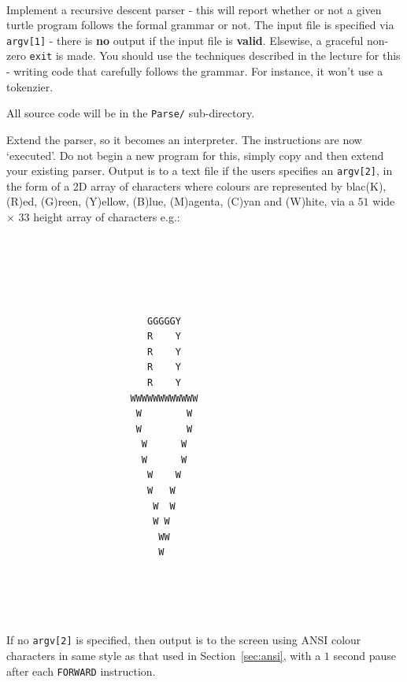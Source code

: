 \begin{exercise}

\strut\\[1em]
\vspace*{1ex}

\noindent Implement a recursive descent parser - this will report
whether or not a given turtle program follows the formal grammar or not.
The input file is specified via \verb^argv[1]^ - there is {\bf no}
output if the input file is {\bf valid}. Elsewise, a graceful non-zero
\verb^exit^ is made.  You should use the techniques described in the
lecture for this - writing code that carefully follows the grammar. For
instance, it won't use a tokenzier.

\noindent All source code will be in the \verb^Parse/^ sub-directory.

\vspace*{1em}

\noindent Extend the parser, so it becomes an interpreter. The
instructions are now `executed'. Do not begin a new program for this,
simply copy and then extend your existing parser. Output is to a text
file if the users specifies an \verb^argv[2]^, in the form of a 2D array
of characters where colours are represented by blac(K), (R)ed, (G)reen,
(Y)ellow, (B)lue, (M)agenta, (C)yan and (W)hite, via a $51$ wide $\times$
$33$ height array of characters e.g.:

\begin{verbatim}





                         GGGGGY
                         R    Y
                         R    Y
                         R    Y
                         R    Y
                      WWWWWWWWWWWW
                       W        W
                       W        W
                        W      W
                        W      W
                         W    W
                         W   W
                          W  W
                          W W
                           WW
                           W





\end{verbatim}

\noindent If no \verb^argv[2]^ is specified, then output is to the
screen using ANSI colour characters in same style as that used in
Section~\ref{sec:ansi}, with a $1$ second pause after each \verb^FORWARD^
instruction. 


\end{exercise}
